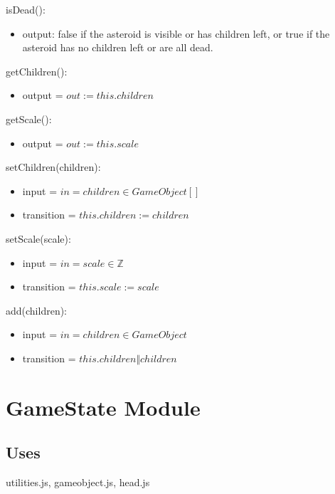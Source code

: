 \documentclass[12pt]{article}
\begin{document}
\noindent isDead():
\begin{itemize}
    \item output: false if the asteroid is visible or has children left, or true if the asteroid has no children left or are all dead.
\end{itemize}

\noindent getChildren():
\begin{itemize}
    \item output = $out := this.children$
\end{itemize}

\noindent getScale():
\begin{itemize}
    \item output = $out := this.scale$
\end{itemize}

\noindent setChildren(children):
\begin{itemize}
    \item input = $in = children \in GameObject[]$
    \item transition = $this.children := children$
\end{itemize}

\noindent setScale(scale):
\begin{itemize}
    \item input = $in = scale \in \mathbb{Z}$
    \item transition = $this.scale := scale$
\end{itemize}

\noindent add(children):
\begin{itemize}
    \item input = $in = children \in GameObject$
    \item transition = $this.children \Vert children$
\end{itemize}



\newpage

\section*{GameState Module}

\subsection*{Uses}

utilities.js, gameobject.js, head.js\\
\end{document}

